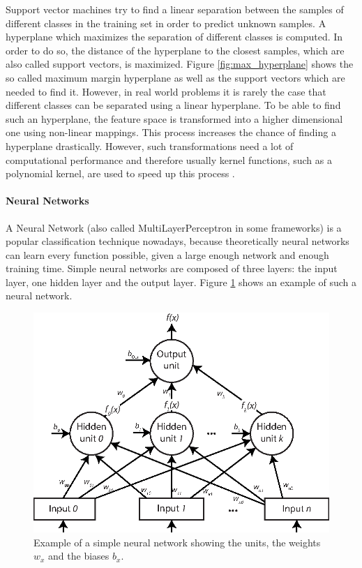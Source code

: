 Support vector machines try to find a linear separation between the samples of different classes in the training set in order to predict unknown samples. A hyperplane which maximizes the separation of different classes is computed. In order to do so, the distance of the hyperplane to the closest samples, which are also called support vectors, is maximized. Figure \ref{fig:max_hyperplane} shows the so called maximum margin hyperplane as well as the support vectors which are needed to find it. However, in real world problems it is rarely the case that different classes can be separated using a linear hyperplane. To be able to find such an hyperplane, the feature space is transformed into a higher dimensional one using non-linear mappings. This process increases the chance of finding a hyperplane drastically. However, such transformations need a lot of computational performance and therefore usually kernel functions, such as a polynomial kernel, are used to speed up this process \cite{Hall2016_DataMining_ML}. 




\paragraph{Neural Networks}

A Neural Network (also called MultiLayerPerceptron in some frameworks) is a popular classification technique nowadays, because theoretically neural networks can learn every function possible, given a large enough network and enough training time. Simple neural networks are composed of three layers: the input layer, one hidden layer and the output layer. Figure \ref{fig:neural_network} shows an example of such a neural network. 

\begin{figure}
	\centering
	\includegraphics{img/neural_network.eps}

	\caption{Example of a simple neural network showing the units, the weights $w_x$ and the biases $b_x$.}
	\label{fig:neural_network}
\end{figure}

